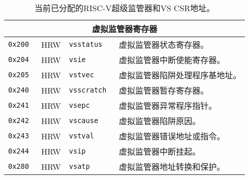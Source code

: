 \begin{table}[htb!]
\begin{center}
\begin{tabular}{|l|l|l|l|}
\hline
\multicolumn{4}{|c|}{虚拟监管器寄存器} \\
\hline
\tt 0x200 & HRW  &\tt vsstatus   & 虚拟监管器状态寄存器。 \\
\tt 0x204 & HRW  &\tt vsie       & 虚拟监管器中断使能寄存器。 \\
\tt 0x205 & HRW  &\tt vstvec     & 虚拟监管器陷阱处理程序基地址。 \\
\tt 0x240 & HRW  &\tt vsscratch  & 虚拟监管器暂存寄存器。 \\
\tt 0x241 & HRW  &\tt vsepc      & 虚拟监管器异常程序指针。 \\
\tt 0x242 & HRW  &\tt vscause    & 虚拟监管器陷阱原因。 \\
\tt 0x243 & HRW  &\tt vstval     & 虚拟监管器错误地址或指令。 \\
\tt 0x244 & HRW  &\tt vsip       & 虚拟监管器中断挂起。 \\
\tt 0x280 & HRW  &\tt vsatp      & 虚拟监管器地址转换和保护。 \\
\hline
\end{tabular}
\end{center}
\caption{当前已分配的RISC-V超级监管器和VS CSR地址。
    }
\label{hcsrnames}
\end{table}


